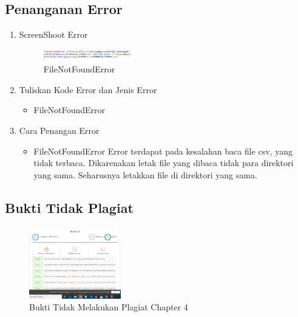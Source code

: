 \subsection{Penanganan Error}
\begin{enumerate}
	\item ScreenShoot Error
	\begin{figure}[H]
		\includegraphics[width=4cm]{figures/1174096/tugas4/error.PNG}
		\centering
		\caption{FileNotFoundError}
	\end{figure}
	\item Tuliskan Kode Error dan Jenis Error
	\begin{itemize}
		\item FileNotFoundError
	\end{itemize}
	\item Cara Penangan Error
	\begin{itemize}
		\item FileNotFoundError
		\hfill\break
		Error terdapat pada kesalahan baca file csv, yang tidak terbaca. Dikarenakan letak file yang dibaca tidak para direktori yang sama. Seharusnya letakkan file di direktori yang sama. 
	\end{itemize}
\end{enumerate}
\subsection{Bukti Tidak Plagiat}
\begin{figure}[H]
\centering
	\includegraphics[width=4cm]{figures/1174096/tugas4/plagiat.PNG}
	\caption{Bukti Tidak Melakukan Plagiat Chapter 4}
\end{figure}

